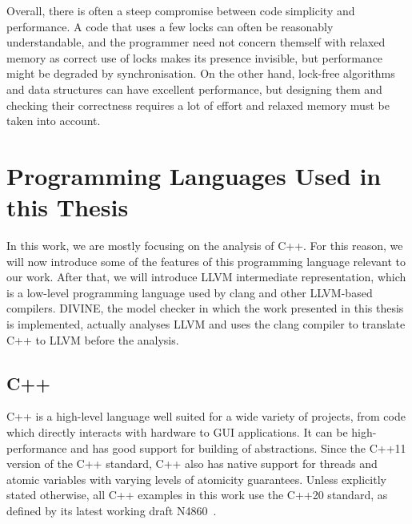 Overall, there is often a steep compromise between code simplicity and
performance.
A code that uses a few locks can often be reasonably understandable, and the
programmer need not concern themself with relaxed memory as correct use of
locks makes its presence invisible, but performance might be degraded by
synchronisation.
On the other hand, lock-free algorithms and data structures can have excellent
performance, but designing them and checking their correctness requires a lot
of effort and relaxed memory must be taken into account.

% 


\section{Programming Languages Used in this Thesis}

In this work, we are mostly focusing on the analysis of C++.
For this reason, we will now introduce some of the features of this programming language relevant to our work.
After that, we will introduce LLVM intermediate representation, which is a low-level programming language used by clang and other LLVM-based compilers.
DIVINE, the model checker in which the work presented in this thesis is implemented, actually analyses LLVM and uses the clang compiler to translate C++ to LLVM before the analysis.

\subsection{C++}

C++ is a high-level language well suited for a wide variety of projects, from
code which directly interacts with hardware to GUI applications.
It can be high-performance and has good support for building of abstractions.
Since the C++11 version of the C++ standard, C++ also has native support for
threads and atomic variables with varying levels of atomicity guarantees.
Unless explicitly stated otherwise, all C++ examples in this work use the C++20
standard, as defined by its latest working draft N4860~\cite{cpp20}.

